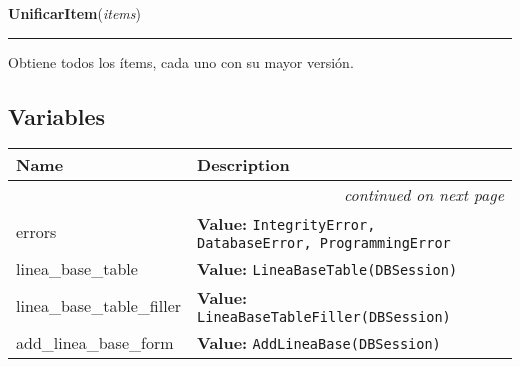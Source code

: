\hspace{.8\funcindent}\begin{boxedminipage}{\funcwidth}

    \raggedright \textbf{UnificarItem}(\textit{items})

    \vspace{-1.5ex}

    \rule{\textwidth}{0.5\fboxrule}
\setlength{\parskip}{2ex}
    Obtiene todos los ítems, cada uno con su mayor versión.

\setlength{\parskip}{1ex}
    \end{boxedminipage}



  \subsection{Variables}

    \vspace{-1cm}
\hspace{\varindent}\begin{longtable}{|p{\varnamewidth}|p{\vardescrwidth}|l}
\cline{1-2}
\cline{1-2} \centering \textbf{Name} & \centering \textbf{Description}& \\
\cline{1-2}
\endhead\cline{1-2}\multicolumn{3}{r}{\small\textit{continued on next page}}\\\endfoot\cline{1-2}
\endlastfoot\raggedright e\-r\-r\-o\-r\-s\- & \raggedright \textbf{Value:} 
{\tt IntegrityError, DatabaseError, ProgrammingError}&\\
\cline{1-2}
\raggedright l\-i\-n\-e\-a\-\_\-b\-a\-s\-e\-\_\-t\-a\-b\-l\-e\- & \raggedright \textbf{Value:} 
{\tt LineaBaseTable(DBSession)}&\\
\cline{1-2}
\raggedright l\-i\-n\-e\-a\-\_\-b\-a\-s\-e\-\_\-t\-a\-b\-l\-e\-\_\-f\-i\-l\-l\-e\-r\- & \raggedright \textbf{Value:} 
{\tt LineaBaseTableFiller(DBSession)}&\\
\cline{1-2}
\raggedright a\-d\-d\-\_\-l\-i\-n\-e\-a\-\_\-b\-a\-s\-e\-\_\-f\-o\-r\-m\- & \raggedright \textbf{Value:} 
{\tt AddLineaBase(DBSession)}&\\
\cline{1-2}
\end{longtable}



